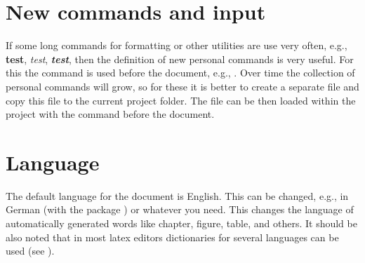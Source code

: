 
\section{New commands and input}

If some long commands for formatting or other utilities are use very often, e.g., \textbf{test}, \textit{test}, \textbf{\textit{test}}, then the definition of new personal commands is very useful. For this the command  is used before the document, e.g., . Over time the collection of personal commands will grow, so for these it is better to create a separate file and copy this file to the current project folder. The file can be then loaded within the project with the command  before the document.


\section{Language}

The default language for the document is English. This can be changed, e.g., in German (with the package ) or whatever you need. This changes the language of automatically generated words like chapter, figure, table, and others. It should be also noted that in most latex editors dictionaries for several languages can be used (see ).